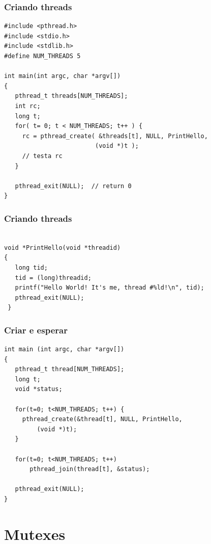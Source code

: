 \documentclass[xcolor=dvipsnames,11pt,presentation,aspectratio=169]{beamer}
\begin{document}
\begin{frame}[fragile]
  \frametitle{Criando threads}
\begin{lstlisting}
#include <pthread.h>
#include <stdio.h>
#include <stdlib.h>
#define NUM_THREADS	5

int main(int argc, char *argv[])
{
   pthread_t threads[NUM_THREADS];
   int rc;
   long t;
   for( t= 0; t < NUM_THREADS; t++ ) {
     rc = pthread_create( &threads[t], NULL, PrintHello,
                         (void *)t );
     // testa rc
   }

   pthread_exit(NULL);  // return 0
}
\end{lstlisting}
\end{frame}

% 
\begin{frame}[fragile]
  \frametitle{Criando threads}
\begin{lstlisting}

void *PrintHello(void *threadid)
{
   long tid;
   tid = (long)threadid;
   printf("Hello World! It's me, thread #%ld!\n", tid);
   pthread_exit(NULL);
 }

\end{lstlisting}
\end{frame}
\begin{frame}[fragile]
  \frametitle{Criar e esperar}
\begin{lstlisting}
int main (int argc, char *argv[])
{
   pthread_t thread[NUM_THREADS];
   long t;
   void *status;

   for(t=0; t<NUM_THREADS; t++) {
     pthread_create(&thread[t], NULL, PrintHello,
         (void *)t); 
   }

   for(t=0; t<NUM_THREADS; t++)
       pthread_join(thread[t], &status);

   pthread_exit(NULL);
}
\end{lstlisting}
\end{frame}


\section{Mutexes}
\end{document}
